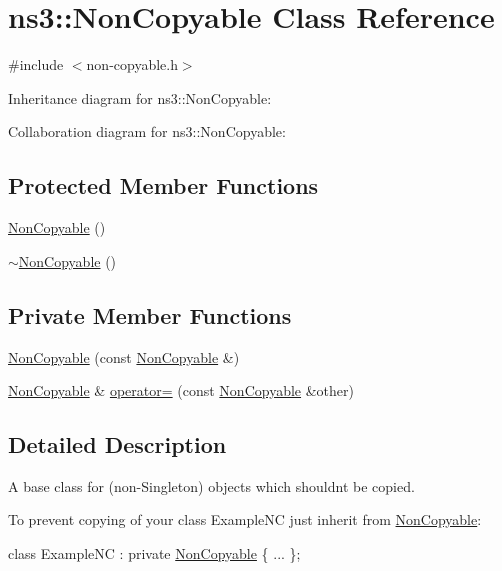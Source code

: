 \hypertarget{classns3_1_1NonCopyable}{}\section{ns3\+:\+:Non\+Copyable Class Reference}
\label{classns3_1_1NonCopyable}


{\ttfamily \#include $<$non-\/copyable.\+h$>$}



Inheritance diagram for ns3\+:\+:Non\+Copyable\+:


Collaboration diagram for ns3\+:\+:Non\+Copyable\+:
\subsection*{Protected Member Functions}
\begin{DoxyCompactItemize}
\item 
\hyperlink{classns3_1_1NonCopyable_a45264501a8a06b7b566aa90f0e1f73ab}{Non\+Copyable} ()
\item 
\hyperlink{classns3_1_1NonCopyable_a58336600fbda909eae24f3389a8bc2c3}{$\sim$\+Non\+Copyable} ()
\end{DoxyCompactItemize}
\subsection*{Private Member Functions}
\begin{DoxyCompactItemize}
\item 
\hyperlink{classns3_1_1NonCopyable_ac7c4d30032e519fb2d266a5bfb015101}{Non\+Copyable} (const \hyperlink{classns3_1_1NonCopyable}{Non\+Copyable} \&)
\item 
\hyperlink{classns3_1_1NonCopyable}{Non\+Copyable} \& \hyperlink{classns3_1_1NonCopyable_a03f1f809b9affb7afa0dc5a17562d7b6}{operator=} (const \hyperlink{classns3_1_1NonCopyable}{Non\+Copyable} \&other)
\end{DoxyCompactItemize}


\subsection{Detailed Description}
A base class for (non-\/\+Singleton) objects which shouldn\textquotesingle{}t be copied.

To prevent copying of your {\ttfamily class Example\+NC} just inherit from \hyperlink{classns3_1_1NonCopyable}{Non\+Copyable}\+: 
\begin{DoxyCode}
\textcolor{keyword}{class }ExampleNC : \textcolor{keyword}{private} \hyperlink{classns3_1_1NonCopyable_a45264501a8a06b7b566aa90f0e1f73ab}{NonCopyable} \{ ... \};
\end{DoxyCode}


